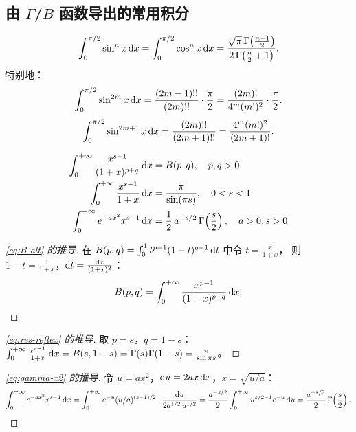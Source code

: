 \documentclass{ctexart}
\begin{document}
\subsection{由 $\Gamma$/$B$ 函数导出的常用积分}

\begin{proposition}[Wallis 积分]
  \[
    \int_0^{\pi/2}\sin^n x\,\mathrm{d} x
    = \int_0^{\pi/2}\cos^n x\,\mathrm{d} x
    = \frac{\sqrt{\pi}\,\Gamma\!\left(\frac{n+1}{2}\right)}{2\,\Gamma\!\left(\frac{n}{2}+1\right)}.
  \]
  特别地：
  \[
    \int_0^{\pi/2}\sin^{2m}x\,\mathrm{d} x = \frac{(2m-1)!!}{(2m)!!}\cdot\frac{\pi}{2}
    = \frac{(2m)!}{4^m(m!)^2}\cdot\frac{\pi}{2}.
  \]
  \[
    \int_0^{\pi/2}\sin^{2m+1}x\,\mathrm{d} x = \frac{(2m)!!}{(2m+1)!!}
    = \frac{4^m(m!)^2}{(2m+1)!}.
  \]
\end{proposition}

\begin{proposition}[含参广义积分]
  \begin{align}
    \int_0^{+\infty} \frac{x^{s-1}}{(1+x)^{p+q}}\,\mathrm{d} x
    &= B(p,q), \quad p,q > 0 \label{eq:B-alt} \\
    \int_0^{+\infty} \frac{x^{s-1}}{1+x}\,\mathrm{d} x
    &= \frac{\pi}{\sin(\pi s)}, \quad 0 < s < 1 \label{eq:res-reflex} \\
    \int_0^{+\infty} e^{-ax^2} x^{s-1}\,\mathrm{d} x
    &= \frac{1}{2}\,a^{-s/2}\,\Gamma\!\left(\frac{s}{2}\right), \quad a > 0, s > 0 \label{eq:gamma-x2}
  \end{align}
\end{proposition}

\begin{proof}[\eqref{eq:B-alt} 的推导]
  在 $B(p,q) = \int_0^1 t^{p-1}(1-t)^{q-1}\,\mathrm{d} t$ 中令 $t = \frac{x}{1+x}$，
  则 $1-t = \frac{1}{1+x}$，$\mathrm{d} t = \frac{\mathrm{d} x}{(1+x)^2}$：
  \[
    B(p,q) = \int_0^{+\infty} \frac{x^{p-1}}{(1+x)^{p+q}}\,\mathrm{d} x.
  \]
\end{proof}

\begin{proof}[\eqref{eq:res-reflex} 的推导]
  取 $p = s$，$q = 1-s$：
  $\int_0^{+\infty}\frac{x^{s-1}}{1+x}\,\mathrm{d} x = B(s, 1-s) = \Gamma(s)\Gamma(1-s) = \frac{\pi}{\sin\pi s}$。
\end{proof}

\begin{proof}[\eqref{eq:gamma-x2} 的推导]
  令 $u = ax^2$，$\mathrm{d} u = 2ax\,\mathrm{d} x$，$x = \sqrt{u/a}$：
  \[
    \int_0^{+\infty} e^{-ax^2}x^{s-1}\,\mathrm{d} x
    = \int_0^{+\infty} e^{-u}(u/a)^{(s-1)/2}\cdot\frac{\mathrm{d} u}{2a^{1/2}\,u^{1/2}}
    = \frac{a^{-s/2}}{2}\int_0^{+\infty}u^{s/2-1}e^{-u}\,\mathrm{d} u
    = \frac{a^{-s/2}}{2}\,\Gamma\!\left(\frac{s}{2}\right).
  \]
\end{proof}
\end{document}
